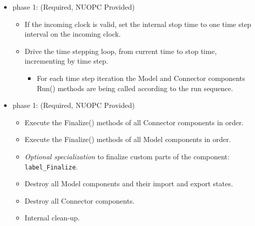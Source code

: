 \begin{itemize}
\item phase 1: ({\sc Required, NUOPC Provided})
  \begin{itemize}
  \item If the incoming clock is valid, set the internal stop time to one time step interval on the incoming clock.
  \item Drive the time stepping loop, from current time to stop time, incrementing by time step.
  \begin{itemize}
    \item For each time step iteration the Model and Connector components Run() methods are being called according to the run sequence.
  \end{itemize}  
  \end{itemize}    
\end{itemize}

\begin{itemize}
\item phase 1: ({\sc Required, NUOPC Provided})
  \begin{itemize}
  \item Execute the Finalize() methods of all Connector components in order.
  \item Execute the Finalize() methods of all Model components in order.
  \item {\it Optional specialization} to finalize custom parts of the component: {\tt label\_Finalize}.
  \item Destroy all Model components and their import and export states.
  \item Destroy all Connector components.
  \item Internal clean-up.
  \end{itemize}      
\end{itemize}

\mbox{}\hrulefill\ 


